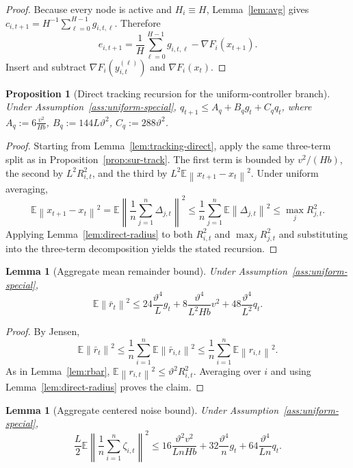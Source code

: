 \documentclass{article}
\newtheorem{lemma}[theorem]{Lemma}
\newtheorem{proposition}[theorem]{Proposition}
\theoremstyle{definition}
\newcommand{\EE}{\mathbb E}
\newcommand{\norm}[1]{\left\lVert #1\right\rVert}
\begin{document}
\begin{proof}
Because every node is active and $H_i\equiv H$, Lemma~\ref{lem:avg} gives
$ c_{i,t+1}=H^{-1}\sum_{\ell=0}^{H-1}g_{i,t,\ell}$. Therefore
\[
e_{i,t+1}
=
\frac1H\sum_{\ell=0}^{H-1}g_{i,t,\ell}-\nabla F_i(x_{t+1}).
\]
Insert and subtract $\nabla F_i(y_{i,t}^{(\ell)})$ and $\nabla F_i(x_t)$.
\end{proof}

\begin{proposition}[Direct tracking recursion for the uniform-controller branch]
\label{prop:direct-q}
Under Assumption~\ref{ass:uniform-special}, $q_{t+1}\le A_q+B_q g_t+C_q q_t$,
where
$A_q:=6\frac{v^2}{H b}$,
$B_q:=144L\vartheta^2$,
$C_q:=288\vartheta^2$.
\end{proposition}

\begin{proof}
Starting from Lemma~\ref{lem:tracking-direct}, apply the same three-term split
as in Proposition~\ref{prop:sur-track}. The first term is bounded by
$v^2/(Hb)$, the second by $L^2R_{i,t}^2$, and the third by
$L^2\EE\norm{x_{t+1}-x_t}^2$. Under uniform averaging,
\[
\EE\norm{x_{t+1}-x_t}^2
=
\EE\left\|\frac1n\sum_{j=1}^n \Delta_{j,t}\right\|^2
\le
\frac1n\sum_{j=1}^n \EE\norm{\Delta_{j,t}}^2
\le
\max_j R_{j,t}^2.
\]
Applying Lemma~\ref{lem:direct-radius} to both $R_{i,t}^2$ and $\max_jR_{j,t}^2$
and substituting into the three-term decomposition yields the stated recursion.
\end{proof}

\begin{lemma}[Aggregate mean remainder bound]
\label{lem:agg-r}
Under Assumption~\ref{ass:uniform-special},
\[
\EE\norm{\bar r_t}^2
\le
24\frac{\vartheta^4}{L}g_t
+
8\frac{\vartheta^4}{L^2 H b}v^2
+
48\frac{\vartheta^4}{L^2}q_t.
\]
\end{lemma}

\begin{proof}
By Jensen,
\[
\EE\norm{\bar r_t}^2
\le
\frac1n\sum_{i=1}^n \EE\norm{\bar r_{i,t}}^2
\le
\frac1n\sum_{i=1}^n \EE\norm{r_{i,t}}^2.
\]
As in Lemma~\ref{lem:rbar},
$\EE\norm{r_{i,t}}^2\le \vartheta^2 R_{i,t}^2$. Averaging over $i$ and using
Lemma~\ref{lem:direct-radius} proves the claim.
\end{proof}

\begin{lemma}[Aggregate centered noise bound]
\label{lem:agg-noise}
Under Assumption~\ref{ass:uniform-special},
\[
\frac{L}{2}\EE\!\left\|
\frac1n\sum_{i=1}^n \zeta_{i,t}
\right\|^2
\le
16\frac{\vartheta^2 v^2}{L n H b}
+
32\frac{\vartheta^4}{n}g_t
+
64\frac{\vartheta^4}{L n}q_t.
\]
\end{lemma}
\end{document}
